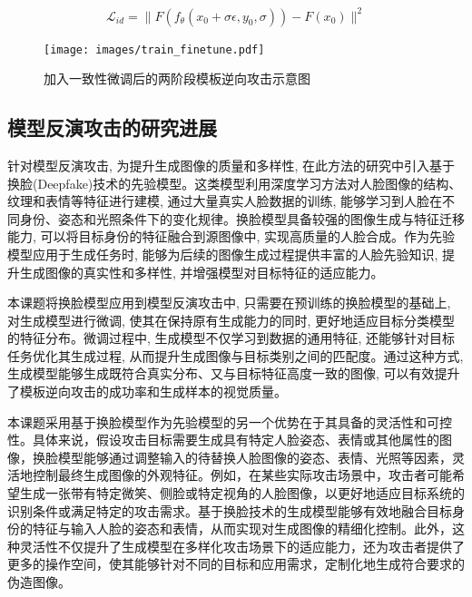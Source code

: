\[
  \mathcal{L}_{id} = \| F( f_\theta(x_0 + \sigma \epsilon,y_0,\sigma)) - F(x_0) \|^2
\]

\begin{figure}[htbp]
  \centering
  \texttt{[image: images/train\_finetune.pdf]}
  \caption{加入一致性微调后的两阶段模板逆向攻击示意图}
  \label{fig:consistency_finetune}
\end{figure}


\subsection{模型反演攻击的研究进展}

针对模型反演攻击, 为提升生成图像的质量和多样性, 在此方法的研究中引入基于换脸(Deepfake)技术的先验模型。这类模型利用深度学习方法对人脸图像的结构、纹理和表情等特征进行建模, 通过大量真实人脸数据的训练, 能够学习到人脸在不同身份、姿态和光照条件下的变化规律。换脸模型具备较强的图像生成与特征迁移能力, 可以将目标身份的特征融合到源图像中, 实现高质量的人脸合成。作为先验模型应用于生成任务时, 能够为后续的图像生成过程提供丰富的人脸先验知识, 提升生成图像的真实性和多样性, 并增强模型对目标特征的适应能力。

本课题将换脸模型应用到模型反演攻击中, 只需要在预训练的换脸模型的基础上, 对生成模型进行微调, 使其在保持原有生成能力的同时, 更好地适应目标分类模型的特征分布。微调过程中, 生成模型不仅学习到数据的通用特征, 还能够针对目标任务优化其生成过程, 从而提升生成图像与目标类别之间的匹配度。通过这种方式, 生成模型能够生成既符合真实分布、又与目标特征高度一致的图像, 可以有效提升了模板逆向攻击的成功率和生成样本的视觉质量。

本课题采用基于换脸模型作为先验模型的另一个优势在于其具备的灵活性和可控性。具体来说，假设攻击目标需要生成具有特定人脸姿态、表情或其他属性的图像，换脸模型能够通过调整输入的待替换人脸图像的姿态、表情、光照等因素，灵活地控制最终生成图像的外观特征。例如，在某些实际攻击场景中，攻击者可能希望生成一张带有特定微笑、侧脸或特定视角的人脸图像，以更好地适应目标系统的识别条件或满足特定的攻击需求。基于换脸技术的生成模型能够有效地融合目标身份的特征与输入人脸的姿态和表情，从而实现对生成图像的精细化控制。此外，这种灵活性不仅提升了生成模型在多样化攻击场景下的适应能力，还为攻击者提供了更多的操作空间，使其能够针对不同的目标和应用需求，定制化地生成符合要求的伪造图像。

